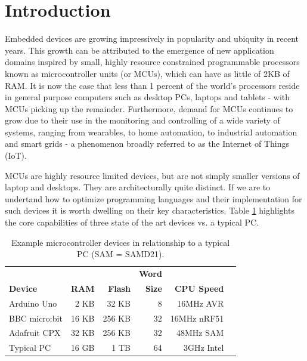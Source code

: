 \section{Introduction}
\label{sec:intro}

Embedded devices are growing impressively in popularity and ubiquity in recent years.
This growth can be attributed to the emergence of new application domains inspired by small, 
highly resource constrained programmable processors known as microcontroller units (or MCUs), 
which can have as little of 2KB of RAM. It is now the case that less than 1 percent of 
the world's processors reside in general purpose computers such as desktop PCs, laptops and tablets 
- with MCUs picking up the remainder.
Furthermore, demand for MCUs continues to grow due to their use in the monitoring and 
controlling of a wide variety of systems, ranging from wearables, to home automation, to 
industrial automation and smart grids - a phenomenon broadly referred to as the Internet of Things (IoT).

MCUs are highly resource limited devices, but are not simply smaller versions of laptop and desktops. 
They are architecturally quite distinct. If we are to undertand how to optimize 
programming languages and their implementation for such devices it is worth dwelling on their key characteristics. 
Table \ref{table:devices} highlights the core capabilities of three state of the art devices vs. a typical PC. 

\begin{table}[]
    \centering
    \begin{tabular}{|l|r|r|r|r|r|}
    \hline
                           &          &              & \bf{Word}  &                 \\
    \bf{Device}            & \bf{RAM} & \bf{Flash}   & \bf{Size}  & \bf{CPU Speed}  \\ \hline
    Arduino Uno            & 2 KB       & 32 KB      & 8          & 16MHz AVR       \\ \hline
    BBC micro:bit          & 16 KB      & 256 KB     & 32         & 16MHz nRF51     \\ \hline
    Adafruit CPX           & 32 KB      & 256 KB     & 32         & 48MHz SAM    \\ \hline
    Typical PC             & 16 GB      & 1 TB       & 64         & 3GHz Intel      \\ \hline
    \end{tabular}
    \caption{\label{table:devices}Example microcontroller devices in relationship to a typical PC (SAM = SAMD21).}
    \end{table}

